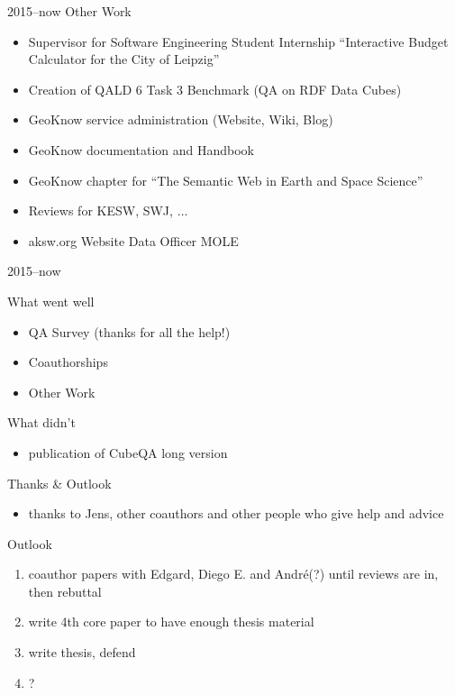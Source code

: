 \documentclass[14pt]{beamer}
\begin{document}
\begin{frame}{2015--now Other Work}
\begin{itemize}
\item Supervisor for Software Engineering Student Internship \enquote{Interactive Budget Calculator for the City of Leipzig}
\item Creation of QALD 6 Task 3 Benchmark (QA on RDF Data Cubes)
\item GeoKnow service administration (Website, Wiki, Blog)
\item GeoKnow documentation and Handbook
\item GeoKnow chapter for \enquote{The Semantic Web in Earth and Space Science}
\item Reviews for KESW, SWJ, $\ldots$
\item aksw.org Website Data Officer MOLE
\end{itemize}
\end{frame}

\begin{frame}{2015--now }
\begin{block}{What went well}
\begin{itemize}
\item QA Survey (thanks for all the help!) 
\item Coauthorships 
\item Other Work 
\end{itemize}
\end{block}
\begin{block}{What didn't}
\begin{itemize}
\item publication of CubeQA long version
\end{itemize}
\end{block}
\end{frame}

\begin{frame}{Thanks \& Outlook}
\begin{itemize}
\item thanks to Jens, other coauthors and other people who give help and advice
\end{itemize}
\begin{block}{Outlook}
\begin{enumerate}
\item coauthor papers with Edgard, Diego E. and André(?) until reviews are in, then rebuttal
\item write 4th core paper to have enough thesis material
\item write thesis, defend
\item ?
\end{enumerate}
\end{block}
\end{frame}
\end{document}
